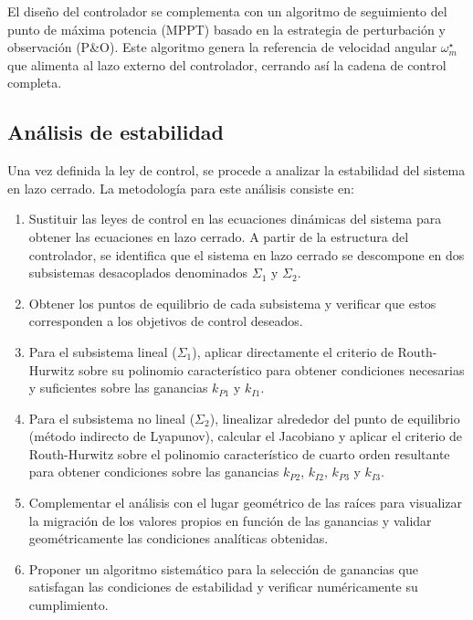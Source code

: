 El diseño del controlador se complementa con un algoritmo de seguimiento 
del punto de máxima potencia (MPPT) basado en la estrategia de perturbación 
y observación (P\&O). Este algoritmo genera la referencia de velocidad 
angular $\omega_m^{\star}$ que alimenta al lazo externo del controlador, 
cerrando así la cadena de control completa.

\subsection{Análisis de estabilidad}

Una vez definida la ley de control, se procede a analizar la estabilidad 
del sistema en lazo cerrado. La metodología para este análisis consiste en:

\begin{enumerate}
    \item Sustituir las leyes de control en las ecuaciones dinámicas del 
    sistema para obtener las ecuaciones en lazo cerrado. A partir de la 
    estructura del controlador, se identifica que el sistema en lazo cerrado 
    se descompone en dos subsistemas desacoplados denominados $\Sigma_1$ y 
    $\Sigma_2$.

    \item Obtener los puntos de equilibrio de cada subsistema y verificar 
    que estos corresponden a los objetivos de control deseados.

    \item Para el subsistema lineal ($\Sigma_1$), aplicar directamente el 
    criterio de Routh-Hurwitz sobre su polinomio característico para 
    obtener condiciones necesarias y suficientes sobre las ganancias $k_{P1}$ 
    y $k_{I1}$.

    \item Para el subsistema no lineal ($\Sigma_2$), linealizar alrededor 
    del punto de equilibrio (método indirecto de Lyapunov), calcular el 
    Jacobiano y aplicar el criterio de Routh-Hurwitz sobre el polinomio 
    característico de cuarto orden resultante para obtener condiciones sobre 
    las ganancias $k_{P2}$, $k_{I2}$, $k_{P3}$ y $k_{I3}$.

    \item Complementar el análisis con el lugar geométrico de las raíces 
    para visualizar la migración de los valores propios en función de las 
    ganancias y validar geométricamente las condiciones analíticas obtenidas.

    \item Proponer un algoritmo sistemático para la selección de ganancias 
    que satisfagan las condiciones de estabilidad y verificar numéricamente 
    su cumplimiento.
\end{enumerate}

